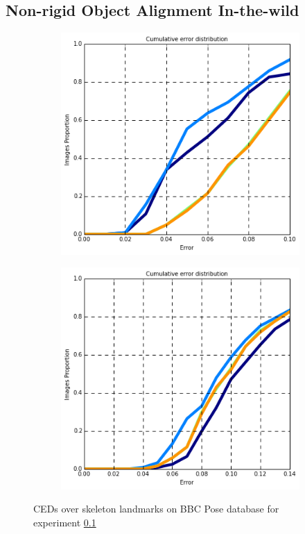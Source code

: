 \subsection{Non-rigid Object Alignment In-the-wild}
\label{exp:daam_benchmark}
\begin{figure}[b!]
    \centering
    \begin{subfigure}[b]{0.23\textwidth}
            \includegraphics[width=\textwidth]{resources/DAAMBenchmark/face}
    \end{subfigure}
    \hfill
    \begin{subfigure}[b]{0.23\textwidth}
            \includegraphics[width=\textwidth]{resources/DAAMBenchmark/ear}
    \end{subfigure}
    \caption{CEDs over skeleton landmarks on BBC Pose database for experiment \ref{exp:daam_benchmark}}
    \label{fig:daam_benchmark}
\end{figure}


